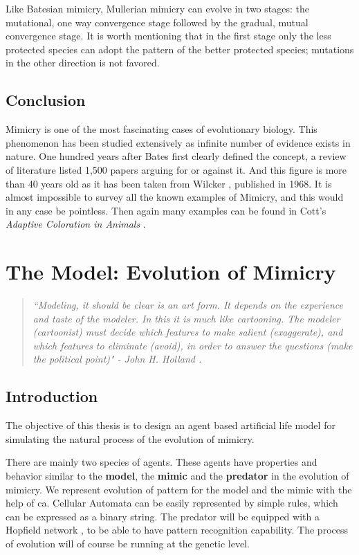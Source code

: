 \documentclass[letterpaper]{article}
\numberwithin{equation}{section}
\begin{document}
Like Batesian mimicry, Mullerian mimicry can evolve in two stages: the mutational, one way convergence stage followed by the gradual, mutual convergence stage. It is worth mentioning that in the first stage only the less protected species can adopt the pattern of the better protected species; mutations in the other direction is not favored.

\subsection{Conclusion}
Mimicry is one of the most fascinating cases of evolutionary biology. This phenomenon has been studied extensively as infinite number of evidence exists in nature. One hundred years after Bates first clearly defined the concept, a review of literature listed 1,500 papers arguing for or against it. And this figure is more than 40 years old as it has been taken from Wilcker \cite{wickler1986}, published in 1968. It is almost impossible to survey all the known examples of Mimicry, and this would in any case be pointless. Then again many examples can be found in Cott's \textit{Adaptive Coloration in Animals} \cite{cott1957}.

\section{The Model: Evolution of Mimicry}
\label{section:model}

\begin{quote}
\textsl{``Modeling, it should be clear is an art form. It depends on the experience and taste of the modeler. In this it is much like cartooning. The modeler (cartoonist) must decide which features to make salient (exaggerate), and which features to eliminate (avoid), in order to answer the questions (make the political point)" - John H. Holland \cite{holland1996}.}
\end{quote}

\subsection{Introduction}
The objective of this thesis is to design an agent based artificial life model for simulating the natural process of the evolution of mimicry.

There are mainly two species of agents. These agents have properties and behavior similar to the \textbf{model}, the \textbf{mimic} and the \textbf{predator} in the evolution of mimicry. We represent evolution of pattern for the model and the mimic with the help of \gls{ca}. Cellular Automata can be easily represented by simple rules, which can be expressed as a binary string. The predator will be equipped with a Hopfield network \cite{hopfield1982}, to be able to have pattern recognition capability. The process of evolution will of course be running at the genetic level. 
\end{document}
